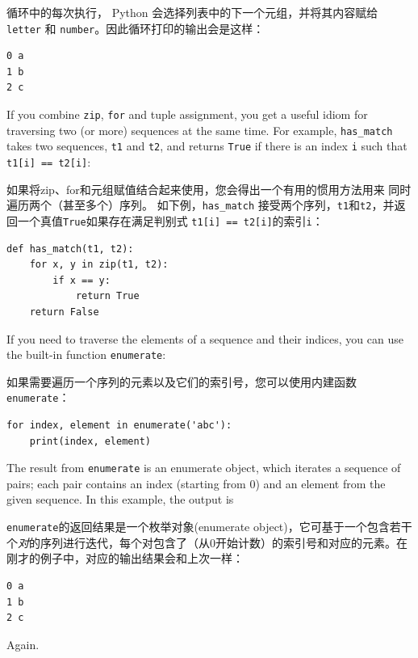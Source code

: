 循环中的每次执行， Python 会选择列表中的下一个元组，并将其内容赋给 \lstinline{letter} 和 \lstinline{number}。因此循环打印的输出会是这样：

\begin{lstlisting}
0 a
1 b
2 c
\end{lstlisting}

%
If you combine {\tt zip}, {\tt for} and tuple assignment, you get a
useful idiom for traversing two (or more) sequences at the same
time.  For example, \verb"has_match" takes two sequences, {\tt t1} and
{\tt t2}, and returns {\tt True} if there is an index {\tt i}
such that {\tt t1[i] == t2[i]}:

如果将zip、for和元组赋值结合起来使用，您会得出一个有用的惯用方法用来
同时遍历两个（甚至多个）序列。 如下例，\lstinline{has_match} 接受两个序列，\lstinline{t1}和\lstinline{t2}，并返回一个真值\lstinline{True}如果存在满足判别式 \lstinline{t1[i] == t2[i]}的索引\lstinline {i}：

\begin{lstlisting}
def has_match(t1, t2):
    for x, y in zip(t1, t2):
        if x == y:
            return True
    return False
\end{lstlisting}

%
If you need to traverse the elements of a sequence and their
indices, you can use the built-in function {\tt enumerate}:

如果需要遍历一个序列的元素以及它们的索引号，您可以使用内建函数\lstinline{enumerate}：
  

\begin{lstlisting}
for index, element in enumerate('abc'):
    print(index, element)
\end{lstlisting}

%
The result from {\tt enumerate} is an enumerate object, which
iterates a sequence of pairs; each pair contains an index (starting
from 0) and an element from the given sequence.
In this example, the output is

\lstinline{enumerate}的返回结果是一个枚举对象(enumerate object)，它可基于一个包含若干个\emph{对}的序列进行迭代，每个对包含了（从0开始计数）的索引号和对应的元素。在刚才的例子中，对应的输出结果会和上次一样：

\begin{lstlisting}
0 a
1 b
2 c
\end{lstlisting}

%
Again.
        



